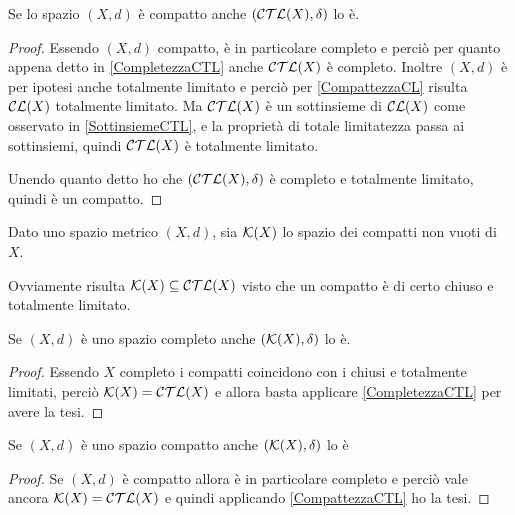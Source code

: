 \begin{corollary}\label{CompattezzaCTL}
	Se lo spazio $(X,d)$ è compatto anche $(\mathcal{CTL}(X),\delta)$ lo è.
\end{corollary}
\begin{proof}
	Essendo $(X,d)$ compatto, è in particolare completo e perciò per quanto appena detto in \cref{CompletezzaCTL} anche $\mathcal{CTL}(X)$ è completo. Inoltre $(X,d)$ è per ipotesi anche totalmente limitato e perciò per \cref{CompattezzaCL} risulta $\mathcal{CL}(X)$ totalmente limitato. Ma $\mathcal{CTL}(X)$ è un sottinsieme di $\mathcal{CL}(X)$ come osservato in \cref{SottinsiemeCTL}, e la proprietà di totale limitatezza passa ai sottinsiemi, quindi $\mathcal{CTL}(X)$ è totalmente limitato.
	
	Unendo quanto detto ho che $(\mathcal{CTL}(X),\delta)$ è completo e totalmente limitato, quindi è un compatto.
\end{proof}

\begin{definition}
	Dato uno spazio metrico $(X,d)$, sia $\mathcal{K}(X)$ lo spazio dei compatti non vuoti di $X$.
\end{definition}
\begin{remark}
	Ovviamente risulta $\mathcal{K}(X)\subseteq \mathcal{CTL}(X)$ visto che un compatto è di certo chiuso e totalmente limitato.
\end{remark}

\begin{corollary}
	Se $(X,d)$ è uno spazio completo anche $(\mathcal{K}(X),\delta)$ lo è.
\end{corollary}
\begin{proof}
	Essendo $X$ completo i compatti coincidono con i chiusi e totalmente limitati, perciò $\mathcal{K}(X)=\mathcal{CTL}(X)$ e allora basta applicare \cref{CompletezzaCTL} per avere la tesi.
\end{proof}


\begin{corollary}
	Se $(X,d)$ è uno spazio compatto anche $(\mathcal{K}(X),\delta)$ lo è
\end{corollary}
\begin{proof}
	Se $(X,d)$ è compatto allora è in particolare completo e perciò vale ancora $\mathcal{K}(X)=\mathcal{CTL}(X)$ e quindi applicando \cref{CompattezzaCTL} ho la tesi. 
\end{proof}






